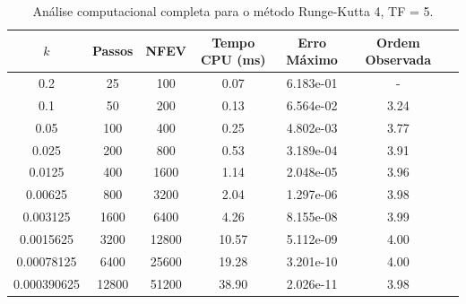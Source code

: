 \begin{table}[H]
    \centering
    \begin{tabular}{ccccccc}
        \hline
        $k$ & Passos & NFEV & Tempo CPU (ms) & Erro Máximo & Ordem Observada \\
        \hline
        0.2 & 25 & 100 & 0.07  & 6.183e-01 & - \\
        0.1 & 50 & 200 & 0.13  & 6.564e-02 & 3.24 \\
        0.05 & 100 & 400 & 0.25  & 4.802e-03 & 3.77 \\
        0.025 & 200 & 800 & 0.53  & 3.189e-04 & 3.91 \\
        0.0125 & 400 & 1600 & 1.14  & 2.048e-05 & 3.96 \\
        0.00625 & 800 & 3200 & 2.04  & 1.297e-06 & 3.98 \\
        0.003125 & 1600 & 6400 & 4.26  & 8.155e-08 & 3.99 \\
        0.0015625 & 3200 & 12800 & 10.57  & 5.112e-09 & 4.00 \\
        0.00078125 & 6400 & 25600 & 19.28  & 3.201e-10 & 4.00 \\
        0.000390625 & 12800 & 51200 & 38.90  & 2.026e-11 & 3.98 \\
        \hline
    \end{tabular}
    \caption{Análise computacional completa para o método Runge-Kutta 4, TF = 5.}
    \label{tab:erros_runge-kutta_4,_tf_=_5}
\end{table}
